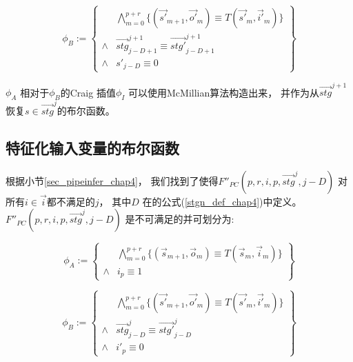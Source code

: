 \begin{equation}
\phi_B :=
\left\{
\begin{array}{cc}
&\bigwedge_{m=0}^{p+r}
\{
(\vec{s'}_{m+1},\vec{o'}_m)\equiv T(\vec{s'}_m,\vec{i'}_m)
\}
\\
\wedge&\vec{stg}^{j+1}_{j-D+1}\equiv \vec{stg'}^{j+1}_{j-D+1} \\
\wedge& s'_{j-D}\equiv 0
\end{array}
\right\}
\end{equation}

$\phi_A$ 相对于$\phi_B$的Craig 插值$\phi_I$  可以使用McMillian算法构造出来，
并作为从$\vec{stg}^{j+1}$恢复$s\in \vec{stg}^{j}$的布尔函数。

\subsection{特征化输入变量的布尔函数}

根据小节\ref{sec_pipeinfer_chap4}，
我们找到了使得$F''_{PC}(p,r,i,p,\vec{stg}^{j},j-D)$ 对所有$i\in \vec{i}$都不满足的$j$，
其中$D$ 在的公式(\ref{stgn_def_chap4})中定义。
$F''_{PC}(p,r,i,p,\vec{stg}^{j},j-D)$ 是不可满足的并可划分为:

\begin{equation}
\phi_A:=
\left\{
\begin{array}{cc}
&\bigwedge_{m=0}^{p+r}
\{
(\vec{s}_{m+1},\vec{o}_m)\equiv T(\vec{s}_m,\vec{i}_m)
\}
\\
\wedge& i_{p}\equiv 1
\end{array}
\right\}
\end{equation}

\begin{equation}
\phi_B:=
\left\{
\begin{array}{cc}
&\bigwedge_{m=0}^{p+r}
\{
(\vec{s'}_{m+1},\vec{o'}_m)\equiv T(\vec{s'}_m,\vec{i'}_m)
\}
\\
\wedge&\vec{stg}^j_{j-D}\equiv \vec{stg'}^j_{j-D} \\
\wedge& i'_{p}\equiv 0
\end{array}
\right\}
\end{equation}

